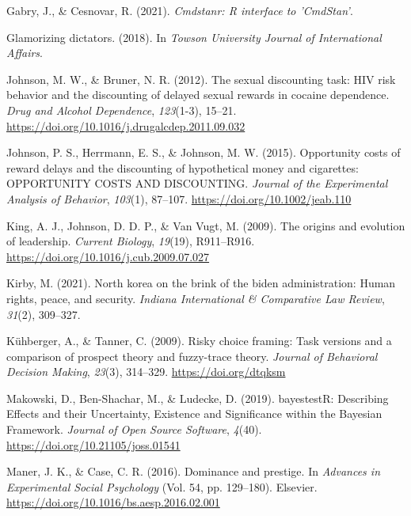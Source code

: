 \documentclass[
  donotrepeattitle,doc, 12pt, a4paper,floatsintext]{apa7}
\newlength{\cslhangindent}
\newlength{\cslentryspacingunit} %
\newenvironment{CSLReferences}[2] %
 {%
  \setlength{\parindent}{0pt}
  \ifodd #1
  \let\oldpar\par
  \def\par{\hangindent=\cslhangindent\oldpar}
  \fi
  \setlength{\parskip}{#2\cslentryspacingunit}
 }%
 {}
\begin{document}
\begin{CSLReferences}{1}{0}
\leavevmode{}%
Gabry, J., \& Cesnovar, R. (2021). \emph{Cmdstanr: {R} interface to '{CmdStan}'}.

\leavevmode{}%
Glamorizing dictators. (2018). In \emph{Towson University Journal of International Affairs}.

\leavevmode{}%
Johnson, M. W., \& Bruner, N. R. (2012). The sexual discounting task: {HIV} risk behavior and the discounting of delayed sexual rewards in cocaine dependence. \emph{Drug and Alcohol Dependence}, \emph{123}(1-3), 15--21. \url{https://doi.org/10.1016/j.drugalcdep.2011.09.032}

\leavevmode{}%
Johnson, P. S., Herrmann, E. S., \& Johnson, M. W. (2015). Opportunity costs of reward delays and the discounting of hypothetical money and cigarettes: {OPPORTUNITY COSTS AND DISCOUNTING}. \emph{Journal of the Experimental Analysis of Behavior}, \emph{103}(1), 87--107. \url{https://doi.org/10.1002/jeab.110}

\leavevmode{}%
King, A. J., Johnson, D. D. P., \& Van Vugt, M. (2009). The origins and evolution of leadership. \emph{Current Biology}, \emph{19}(19), R911--R916. \url{https://doi.org/10.1016/j.cub.2009.07.027}

\leavevmode{}%
Kirby, M. (2021). North korea on the brink of the biden administration: Human rights, peace, and security. \emph{Indiana International \& Comparative Law Review}, \emph{31}(2), 309--327.

\leavevmode{}%
Kühberger, A., \& Tanner, C. (2009). Risky choice framing: Task versions and a comparison of prospect theory and fuzzy-trace theory. \emph{Journal of Behavioral Decision Making}, \emph{23}(3), 314--329. \url{https://doi.org/dtqksm}

\leavevmode{}%
Makowski, D., Ben-Shachar, M., \& Ludecke, D. (2019). {bayestestR}: {Describing Effects} and their {Uncertainty}, {Existence} and {Significance} within the {Bayesian Framework}. \emph{Journal of Open Source Software}, \emph{4}(40). \url{https://doi.org/10.21105/joss.01541}

\leavevmode{}%
Maner, J. K., \& Case, C. R. (2016). Dominance and prestige. In \emph{Advances in {Experimental Social Psychology}} (Vol. 54, pp. 129--180). {Elsevier}. \url{https://doi.org/10.1016/bs.aesp.2016.02.001}


\end{CSLReferences}
\end{document}
